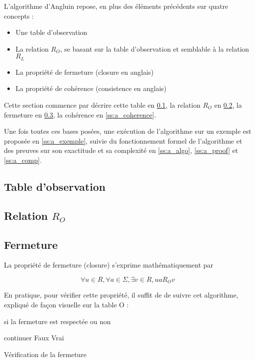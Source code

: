 
L'algorithme d'Angluin repose, en plus des éléments précédents sur quatre concepts :

\begin{itemize}
	\item Une table d'observation
	\item La relation $R_O$, se basant sur la table d'observation et semblable à la relation $R_L$
	\item La propriété de fermeture (closure en anglais)
	\item La propriété de cohérence (consistence en anglais)
\end{itemize}

Cette section commence par décrire cette table en \ref{ss:a_tblo}, la relation $R_O$ en \ref{ss:a_ro}, la fermeture en \ref{ss:a_fermeture}, la cohérence en \ref{ss:a_coherence}.

Une fois toutes ces bases posées, une exécution de l'algorithme sur un exemple est proposée en \ref{ss:a_exemple}, suivie du fonctionnement formel de l'algorithme et des preuves sur son exactitude et sa complexité en \ref{ss:a_algo}, \ref{ss:a_proof} et \ref{ss:a_comp}.


\subsection{Table d'observation}\label{ss:a_tblo}

\subsection{Relation $R_O$}\label{ss:a_ro}

\subsection{Fermeture}\label{ss:a_fermeture}

La propriété de fermeture (closure) s'exprime mathématiquement par 

$$ \forall u \in R, \forall a \in \Sigma, \exists v \in R, ua R_O v$$

En pratique, pour vérifier cette propriété, il suffit de de suivre cet algorithme, expliqué de façon visuelle sur la table O :

\begin{algorithm}[H]
	\begin{algorithmic}[1]
		\ENSURE si la fermeture est respectée ou non
		
				\STATE continuer
			\ELSE
				\STATE {}
					\RETURN Faux
				\ENDIF
			\ENDIF
		\ENDFOR
		\ENDFOR
		\RETURN Vrai
	\end{algorithmic}
	\caption{Vérification de la fermeture}\label{alg:closure}
\end{algorithm}

